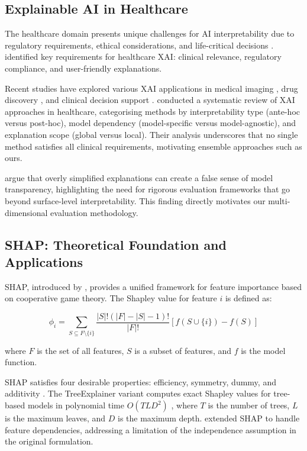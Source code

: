 \documentclass[journal]{IEEEtran}
\newcommand{\citep}[1]{\cite{#1}}
\newcommand{\citet}[1]{\cite{#1}}
\begin{document}
\subsection{Explainable AI in Healthcare}

The healthcare domain presents unique challenges for AI interpretability due to regulatory requirements, ethical considerations, and life-critical decisions \citep{ahmad2018interpretable}. \citet{zhang2021survey} identified key requirements for healthcare XAI: clinical relevance, regulatory compliance, and user-friendly explanations.

Recent studies have explored various XAI applications in medical imaging \citep{selvaraju2017grad}, drug discovery \citep{jimenez2020drug}, and clinical decision support \citep{caruana2015intelligible}. \citet{tjoa2021survey} conducted a systematic review of XAI approaches in healthcare, categorising methods by interpretability type (ante-hoc versus post-hoc), model dependency (model-specific versus model-agnostic), and explanation scope (global versus local). Their analysis underscores that no single method satisfies all clinical requirements, motivating ensemble approaches such as ours.

\citet{ghassemi2021false} argue that overly simplified explanations can create a false sense of model transparency, highlighting the need for rigorous evaluation frameworks that go beyond surface-level interpretability. This finding directly motivates our multi-dimensional evaluation methodology.

\subsection{SHAP: Theoretical Foundation and Applications}

SHAP, introduced by \citet{lundberg2017unified}, provides a unified framework for feature importance based on cooperative game theory. The Shapley value for feature $i$ is defined as:

\begin{equation}
\phi_i = \sum_{S \subseteq F \setminus \{i\}} \frac{|S|!(|F|-|S|-1)!}{|F|!}\left[f(S \cup \{i\}) - f(S)\right]
\end{equation}

where $F$ is the set of all features, $S$ is a subset of features, and $f$ is the model function.

SHAP satisfies four desirable properties: efficiency, symmetry, dummy, and additivity \citep{shapley1953value}. The TreeExplainer variant computes exact Shapley values for tree-based models in polynomial time $O(TLD^2)$ \citep{lundberg2020local}, where $T$ is the number of trees, $L$ is the maximum leaves, and $D$ is the maximum depth. \citet{aas2021explaining} extended SHAP to handle feature dependencies, addressing a limitation of the independence assumption in the original formulation.
\end{document}
